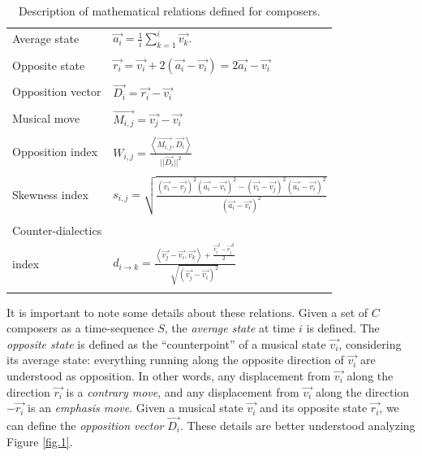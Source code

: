 \documentclass[
 aip,
 jmp,
 amsmath,amssymb,
 reprint,
]{revtex4-1}
\begin{document}
\begin{table}
\caption{\label{tab:tableRelations}Description of mathematical relations defined for composers.}

\begin{ruledtabular}
\begin{tabular}{ll}

\\ Average state & $\vec{a_i} = \frac{1}{i}\sum_{k=1}^i\vec{v_k}.$ \\ \\

Opposite state & $\vec{r_i} = \vec{v_i} + 2(\vec{a_i} - \vec{v_i})  = 2 \vec{a_i} - \vec{v_i}$  \\ \\

Opposition vector & $\vec{D_i}=\vec{r_i} - \vec{v_i}$ \\ \\

Musical move & $\vec{M_{i,j}} = \vec{v_j} - \vec{v_i}$ \\ \\

Opposition index & $W_{i,j} = \frac{\left< \vec{M_{i,j}}, \vec{D_i}\right>}{||\vec{D_i}||^2}$ \\ \\

Skewness index & $s_{i,j} = \sqrt{\frac{(\vec{v_i}-\vec{v_j})^2(\vec{a_i}-\vec{v_i})^2 - (\vec{v_i}-\vec{v_j})^2(\vec{a_i}-\vec{v_i})^2}{(\vec{a_i}-\vec{v_i})^2}}$ \\ \\

Counter-dialectics \\ index & $d_{i \rightarrow k} = \frac{\left< \vec{v_j} - \vec{v_i}, \vec{v_k} \right> + \frac{\vec{v_i}^2 - \vec{v_j}^2}{2}}{\sqrt{(\vec{v_j}-\vec{v_i})^2}}$ \\ \\ 


\end{tabular}
\end{ruledtabular}
\end{table}

It is important to note some details about these relations. Given a set of $C$ composers as a time-sequence $S$, the \emph{average state} at time $i$ is defined. The \emph{opposite state} is defined as the ``counterpoint'' of a musical state $\vec{v_i}$, considering its average state: everything running along the opposite direction of $\vec{v_i}$ are understood as opposition. In other words, any displacement from $\vec{v_i}$ along the direction $\vec{r_i}$ is a \emph{contrary move}, and any displacement from $\vec{v_i}$ along the direction $-\vec{r_i}$ is an \emph{emphasis move}. Given a musical state $\vec{v_i}$ and its opposite state $\vec{r_i}$, we can define the \emph{opposition vector} $\vec{D_i}$. These details are better understood analyzing Figure \ref{fig.1}.
\end{document}
